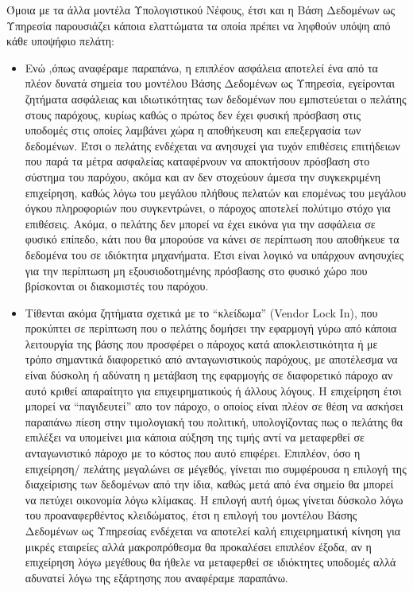 \documentclass{article}
\begin{document}
Όμοια με τα άλλα μοντέλα Υπολογιστικού Νέφους, έτσι και η Βάση Δεδομένων ως Υπηρεσία παρουσιάζει κάποια ελαττώματα τα οποία πρέπει να ληφθούν υπόψη από κάθε υποψήφιο πελάτη:

\begin{itemize}
\item Ενώ ,όπως αναφέραμε παραπάνω, η επιπλέον ασφάλεια αποτελεί ένα από τα πλέον δυνατά σημεία του μοντέλου Βάσης Δεδομένων ως Υπηρεσία, εγείρονται ζητήματα ασφάλειας και ιδιωτικότητας των δεδομένων που εμπιστεύεται ο πελάτης στους παρόχους, κυρίως καθώς ο πρώτος δεν έχει φυσική πρόσβαση στις υποδομές στις οποίες λαμβάνει χώρα η αποθήκευση και επεξεργασία των δεδομένων. Έτσι ο πελάτης ενδέχεται να ανησυχεί για τυχόν επιθέσεις επιτήδειων που παρά τα μέτρα ασφαλείας καταφέρνουν να αποκτήσουν πρόσβαση στο σύστημα του παρόχου, ακόμα και αν δεν στοχεύουν άμεσα την συγκεκριμένη επιχείρηση, καθώς λόγω του μεγάλου πλήθους πελατών και επομένως του μεγάλου όγκου πληροφοριών που συγκεντρώνει, ο πάροχος αποτελεί πολύτιμο στόχο για επιθέσεις. Ακόμα, ο πελάτης δεν μπορεί να έχει εικόνα για την ασφάλεια σε φυσικό επίπεδο, κάτι που θα μπορούσε να κάνει σε περίπτωση που αποθήκευε τα δεδομένα του σε ιδιόκτητα μηχανήματα. Έτσι είναι λογικό να υπάρχουν ανησυχίες για την περίπτωση μη εξουσιοδοτημένης πρόσβασης στο φυσικό χώρο που βρίσκονται οι διακομιστές του παρόχου.
\item Τίθενται ακόμα ζητήματα σχετικά με το “κλείδωμα” (Vendor Lock In), που προκύπτει σε περίπτωση που ο πελάτης δομήσει την εφαρμογή γύρω από κάποια λειτουργία της βάσης που προσφέρει ο πάροχος κατά αποκλειστικότητα ή με τρόπο σημαντικά διαφορετικό από ανταγωνιστικούς παρόχους, με αποτέλεσμα να είναι δύσκολη ή αδύνατη η μετάβαση της εφαρμογής σε διαφορετικό πάροχο αν αυτό κριθεί απαραίτητο για επιχειρηματικούς ή άλλους λόγους. Η επιχείρηση έτσι μπορεί να “παγιδευτεί” απο τον πάροχο, ο οποίος είναι πλέον σε θέση να ασκήσει παραπάνω πίεση στην τιμολογιακή του πολιτική, υπολογίζοντας πως ο πελάτης θα επιλέξει να υπομείνει μια κάποια αύξηση της τιμής αντί να μεταφερθεί σε ανταγωνιστικό πάροχο με το κόστος που αυτό επιφέρει. Επιπλέον, όσο η επιχείρηση/ πελάτης μεγαλώνει σε μέγεθός, γίνεται πιο συμφέρουσα η επιλογή της διαχείρισης των δεδομένων από την ίδια, καθώς μετά από ένα σημείο θα μπορεί να πετύχει οικονομία λόγω κλίμακας. Η επιλογή αυτή όμως γίνεται δύσκολο λόγω του προαναφερθέντος κλειδώματος, έτσι η επιλογή του μοντέλου Βάσης Δεδομένων ως Υπηρεσίας ενδέχεται να αποτελεί καλή επιχειρηματική κίνηση για μικρές εταιρείες αλλά μακροπρόθεσμα θα προκαλέσει επιπλέον έξοδα, αν η επιχείρηση λόγω μεγέθους θα ήθελε να μεταφερθεί σε ιδιόκτητες υποδομές αλλά αδυνατεί λόγω της εξάρτησης που αναφέραμε παραπάνω.

\end{itemize}
\end{document}
